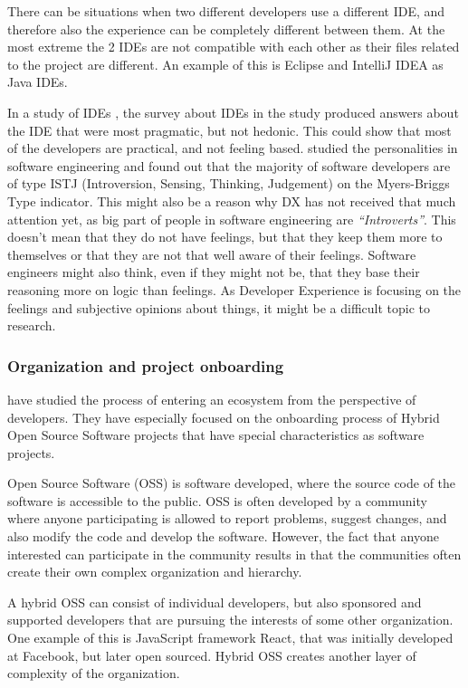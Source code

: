 \documentclass[english, 12pt, a4paper, sci, utf8, a-1b, online]{aaltothesis}
\begin{document}
There can be situations when two different developers use a different IDE, and therefore also the experience can be completely different between them. At the most extreme the 2 IDEs are not compatible with each other as their files related to the project are different. An example of this is Eclipse and IntelliJ IDEA as Java IDEs.

In a study of IDEs \parencite{software-developers-as-users}, the survey about IDEs in the study produced answers about the IDE that were most pragmatic, but not hedonic. This could show that most of the developers are practical, and not feeling based. \textcite{personality-software} studied the personalities in software engineering and found out that the majority of software developers are of type ISTJ (Introversion, Sensing, Thinking, Judgement) on the Myers-Briggs Type indicator. This might also be a reason why DX has not received that much attention yet, as big part of people in software engineering are \textit{``Introverts''}.  This doesn't mean that they do not have feelings, but that they keep them more to themselves or that they are not that well aware of their feelings. Software engineers might also think, even if they might not be, that they base their reasoning more on logic than feelings. As Developer Experience is focusing on the feelings and subjective opinions about things, it might be a difficult topic to research.

\subsubsection{Organization and project onboarding}

\textcite{entering-an-ecosystem} have studied the process of entering an ecosystem from the perspective of developers. They have especially focused on the onboarding process of Hybrid Open Source Software projects that have special characteristics as software projects.

Open Source Software (OSS) is software developed, where the source code of the software is accessible to the public. OSS is often developed by a community where anyone participating is allowed to report problems, suggest changes, and also modify the code and develop the software. However, the fact that anyone interested can participate in the community results in that the communities often create their own complex organization and hierarchy.

A hybrid OSS can consist of individual developers, but also sponsored and supported developers that are pursuing the interests of some other organization. One example of this is JavaScript framework React, that was initially developed at Facebook, but later open sourced. Hybrid OSS creates another layer of complexity of the organization.
\end{document}
